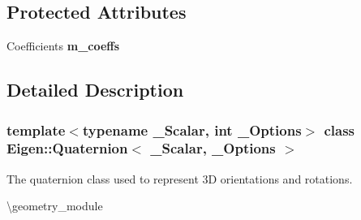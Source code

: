 \subsection*{Protected Attributes}
\begin{DoxyCompactItemize}
\item 
\mbox{\label{class_eigen_1_1_quaternion_af5807aeb42b535b3b79179da009e3506}} 
Coefficients {\bfseries m\+\_\+coeffs}
\end{DoxyCompactItemize}


\subsection{Detailed Description}
\subsubsection*{template$<$typename \+\_\+\+Scalar, int \+\_\+\+Options$>$\newline
class Eigen\+::\+Quaternion$<$ \+\_\+\+Scalar, \+\_\+\+Options $>$}

The quaternion class used to represent 3D orientations and rotations. 

\textbackslash{}geometry\+\_\+module


